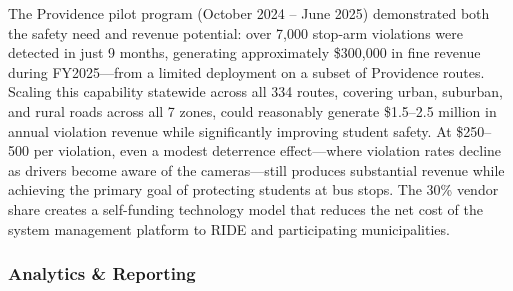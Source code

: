 \begin{description}[style=nextline, leftmargin=0.5cm]
    \item[\faIcon{dollar-sign} \textbf{Revenue Potential:}] The Providence pilot program (October 2024 -- June 2025) demonstrated both the safety need and revenue potential: over 7,000 stop-arm violations were detected in just 9 months, generating approximately \$300,000 in fine revenue during FY2025---from a limited deployment on a subset of Providence routes. Scaling this capability statewide across all 334 routes, covering urban, suburban, and rural roads across all 7 zones, could reasonably generate \$1.5--2.5 million in annual violation revenue while significantly improving student safety. At \$250--500 per violation, even a modest deterrence effect---where violation rates decline as drivers become aware of the cameras---still produces substantial revenue while achieving the primary goal of protecting students at bus stops. The 30\% vendor share creates a self-funding technology model that reduces the net cost of the system management platform to RIDE and participating municipalities.
\end{description}

\subsubsection{Analytics \& Reporting}

